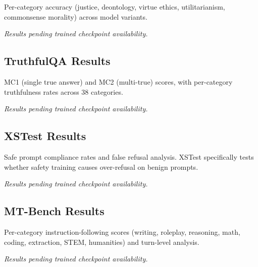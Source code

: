 Per-category accuracy (justice, deontology, virtue ethics, utilitarianism,
commonsense morality) across model variants.

\textit{Results pending trained checkpoint availability.}

\subsection{TruthfulQA Results}

MC1 (single true answer) and MC2 (multi-true) scores, with per-category
truthfulness rates across 38 categories.

\textit{Results pending trained checkpoint availability.}

\subsection{XSTest Results}

Safe prompt compliance rates and false refusal analysis. XSTest specifically
tests whether safety training causes over-refusal on benign prompts.

\textit{Results pending trained checkpoint availability.}

\subsection{MT-Bench Results}

Per-category instruction-following scores (writing, roleplay, reasoning,
math, coding, extraction, STEM, humanities) and turn-level analysis.

\textit{Results pending trained checkpoint availability.}
